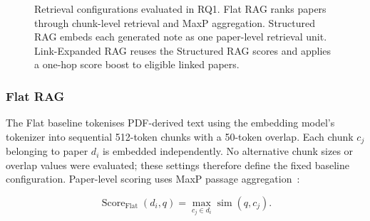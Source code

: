 \documentclass[runningheads]{llncs}
\begin{document}
{\begin{figure}[!t]
{%
    }
    \caption{Retrieval configurations evaluated in RQ1. Flat RAG ranks
    papers through chunk-level retrieval and MaxP aggregation.
    Structured RAG embeds each generated note as one paper-level
    retrieval unit. Link-Expanded RAG reuses the Structured RAG scores
    and applies a one-hop score boost to eligible linked papers.}
    \label{fig:retrieval_configurations}
\end{figure}
}%

\subsubsection{Flat RAG}

The Flat baseline tokenises PDF-derived text using the embedding
model's tokenizer into sequential 512-token chunks with a 50-token
overlap. Each chunk \(c_j\) belonging to paper \(d_i\) is embedded
independently. No alternative chunk sizes or overlap values were
evaluated; these settings therefore define the fixed baseline
configuration. Paper-level scoring uses MaxP passage
aggregation~\cite{dai2019deeper}:

\[
\operatorname{Score}_{\mathrm{Flat}}(d_i,q)
=
\max_{c_j \in d_i}
\operatorname{sim}(q,c_j).
\]
\end{document}
